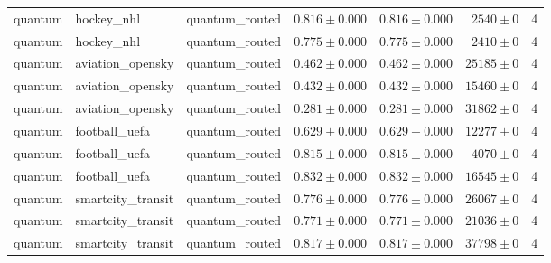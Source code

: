 \begin{table}[htbp]
\begin{tabular}{l l l r r r r}
quantum & hockey\_nhl & quantum\_routed & $0.816\pm0.000$ & $0.816\pm0.000$ & $2540\pm0$ & 4 \\
quantum & hockey\_nhl & quantum\_routed & $0.775\pm0.000$ & $0.775\pm0.000$ & $2410\pm0$ & 4 \\
quantum & aviation\_opensky & quantum\_routed & $0.462\pm0.000$ & $0.462\pm0.000$ & $25185\pm0$ & 4 \\
quantum & aviation\_opensky & quantum\_routed & $0.432\pm0.000$ & $0.432\pm0.000$ & $15460\pm0$ & 4 \\
quantum & aviation\_opensky & quantum\_routed & $0.281\pm0.000$ & $0.281\pm0.000$ & $31862\pm0$ & 4 \\
quantum & football\_uefa & quantum\_routed & $0.629\pm0.000$ & $0.629\pm0.000$ & $12277\pm0$ & 4 \\
quantum & football\_uefa & quantum\_routed & $0.815\pm0.000$ & $0.815\pm0.000$ & $4070\pm0$ & 4 \\
quantum & football\_uefa & quantum\_routed & $0.832\pm0.000$ & $0.832\pm0.000$ & $16545\pm0$ & 4 \\
quantum & smartcity\_transit & quantum\_routed & $0.776\pm0.000$ & $0.776\pm0.000$ & $26067\pm0$ & 4 \\
quantum & smartcity\_transit & quantum\_routed & $0.771\pm0.000$ & $0.771\pm0.000$ & $21036\pm0$ & 4 \\
quantum & smartcity\_transit & quantum\_routed & $0.817\pm0.000$ & $0.817\pm0.000$ & $37798\pm0$ & 4 \\
\hline
\end{tabular}
\end{table}
